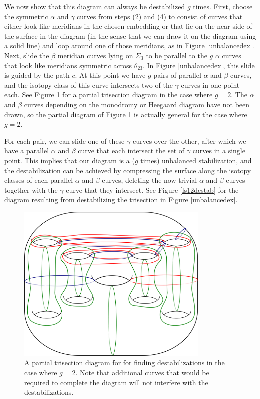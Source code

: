 \documentclass[12pt]{amsart}
\theoremstyle{definition}
\theoremstyle{remark}
\begin{document}
We now show that this diagram can always be destabilized $g$ times.
First, choose the symmetric $\alpha$ and $\gamma$ curves from steps (2) and (4) to consist of curves that either look like meridians in the chosen embedding or that lie on the near side of the surface in the diagram (in the sense that we can draw it on the diagram using a solid line) and loop around one of those meridians, as in Figure \ref{unbalancedex}.
Next, slide the $\beta$ meridian curves lying on $\Sigma_3$ to be parallel to the $g$ $\alpha$ curves that look like meridians symmetric across $\theta_{23}$.
In Figure \ref{unbalancedex}, this slide is guided by the path $c$.
At this point we have $g$ pairs of parallel $\alpha$ and $\beta$ curves, and the isotopy class of this curve intersects two of the $\gamma$ curves in one point each.
See Figure \ref{destabpartial} for a partial trisection diagram in the case where $g=2$.
The $\alpha$ and $\beta$ curves depending on the monodromy or Heegaard diagram have not been drawn, so the partial diagram of Figure \ref{destabpartial} is actually general for the case where $g=2$.

For each pair, we can slide one of these $\gamma$ curves over the other, after which we have a parallel $\alpha$ and $\beta$ curve that each intersect the set of $\gamma$ curves in a single point.
This implies that our diagram is a ($g$ times) unbalanced stabilization, and the destabilization can be achieved by compressing the surface along the isotopy classes of each parallel $\alpha$ and $\beta$ curves, deleting the now trivial $\alpha$ and $\beta$ curves together with the $\gamma$ curve that they intersect.
See Figure \ref{ls12destab} for the diagram resulting from destabilizing the trisection in Figure \ref{unbalancedex}.


\begin{figure}[h]
\centering
\includegraphics[height=3in]{finddestabpartial.png}
\caption{A partial trisection diagram for for finding destabilizations in the case where $g=2$.
Note that additional curves that would be required to complete the diagram will not interfere with the destabilizations.}
\label{destabpartial}
\end{figure}
\end{document}
